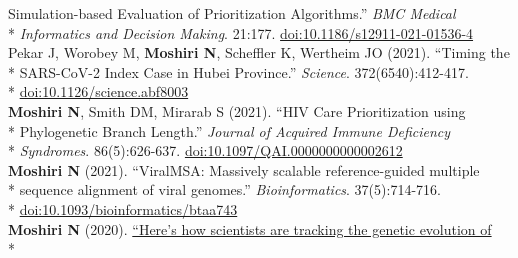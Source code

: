 \documentclass[margin,line]{res}
\begin{document}
\begin{resume}
\hspace*{9.5mm} Simulation-based Evaluation of Prioritization Algorithms.'' \textit{BMC Medical}\\*\vspace{2mm}
\hspace*{8mm} \textit{Informatics and Decision Making}. 21:177. \href{https://doi.org/10.1186/s12911-021-01536-4}{doi:10.1186/s12911-021-01536-4}\\
\hspace*{4mm} Pekar J, Worobey M, \textbf{Moshiri N}, Scheffler K, Wertheim JO (2021). ``Timing the\\*
\hspace*{9.5mm} SARS-CoV-2 Index Case in Hubei Province.'' \textit{Science}. 372(6540):412-417.\\*\vspace{2mm}
\hspace*{8mm} \href{https://doi.org/10.1126/science.abf8003}{doi:10.1126/science.abf8003}\\
\hspace*{4mm} \textbf{Moshiri N}, Smith DM, Mirarab S (2021). ``HIV Care Prioritization using\\*
\hspace*{9.5mm} Phylogenetic Branch Length.'' \textit{Journal of Acquired Immune Deficiency}\\*\vspace{2mm}
\hspace*{8mm} \textit{Syndromes}. 86(5):626-637. \href{https://doi.org/10.1097/QAI.0000000000002612}{doi:10.1097/QAI.0000000000002612}\\
\hspace*{4mm} \textbf{Moshiri N} (2021). ``ViralMSA: Massively scalable reference-guided multiple\\*
\hspace*{9.5mm} sequence alignment of viral genomes.'' \textit{Bioinformatics}. 37(5):714-716.\\*\vspace{2mm}
\hspace*{8mm} \href{https://doi.org/10.1093/bioinformatics/btaa743}{doi:10.1093/bioinformatics/btaa743}\\
\hspace*{4mm} \textbf{Moshiri N} (2020). \href{https://theconversation.com/heres-how-scientists-are-tracking-the-genetic-evolution-of-covid-19-134201}{``Here's how scientists are tracking the genetic evolution of}\\*\vspace{2mm}

\end{resume}
\end{document}
